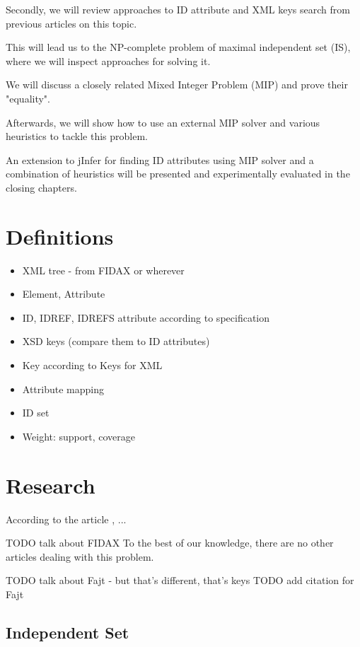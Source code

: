 \documentclass[a4paper,12pt,oneside]{report}
\begin{document}
Secondly, we will review approaches to ID attribute and XML keys search from previous articles on this topic. 

This will lead us to the NP-complete problem of maximal independent set (IS), where we will inspect approaches for solving it.

We will discuss a closely related Mixed Integer Problem (MIP) and prove their "equality".

Afterwards, we will show how to use an external MIP solver and various heuristics to tackle this problem.

An extension to jInfer for finding ID attributes using MIP solver and a combination of heuristics will be presented and experimentally evaluated in the closing chapters.

\chapter{Definitions}

\begin{itemize}
	\item XML tree - from FIDAX or wherever
	\item Element, Attribute
	\item ID, IDREF, IDREFS attribute according to specification
	\item XSD keys (compare them to ID attributes)
	\item Key according to Keys for XML \cite{keX}
	\item Attribute mapping
	\item ID set
  \item Weight: support, coverage
\end{itemize}

\chapter{Research}

According to the article \cite{fidax}, ...

TODO talk about FIDAX
To the best of our knowledge, there are no other articles dealing with this problem. 

TODO talk about Fajt - but that's different, that's keys
TODO add citation for Fajt

\section{Independent Set}
\end{document}
